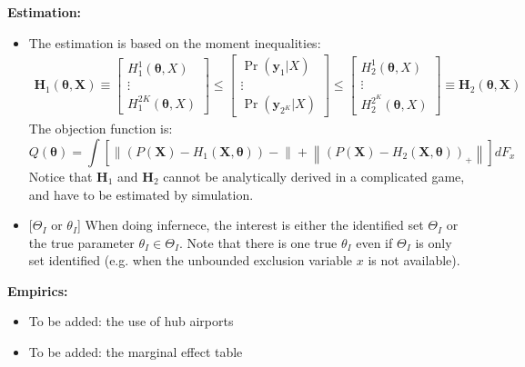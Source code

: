 \documentclass{book}
\theoremstyle{plain}
\theoremstyle{definition}
\newcommand{\red}[1]{{\color{red} #1}}
\newcommand{\mysubtitle}[1]{{\normalsize{\textbf{#1}}}}
\begin{document}
\mysubtitle{Estimation:}
\begin{itemize}
	\item The estimation is based on the moment inequalities:
	\begin{align}
		\mathbf { H } _ { 1 } ( \boldsymbol { \theta } , \mathbf { X } ) \equiv \left[ \begin{array} { c } { H _ { 1 } ^ { 1 } ( \boldsymbol { \theta } , X ) } \\ { \vdots } \\ { H _ { 1 } ^ { 2 K } ( \boldsymbol { \theta } , X ) } \end{array} \right] \leq \left[ \begin{array} { c } { \operatorname { Pr } \left( \mathbf { y } _ { 1 } | X \right) } \\ { \vdots } \\ { \operatorname { Pr } \left( \mathbf { y } _ { 2 ^ { K } } | X \right) } \end{array} \right] \leq \left[ \begin{array} { c } { H _ { 2 } ^ { 1 } ( \boldsymbol { \theta } , X ) } \\ { \vdots } \\ { H _ { 2 } ^ { 2 ^ { K } } ( \boldsymbol { \theta } , X ) } \end{array} \right] \equiv \mathbf { H } _ { 2 } ( \boldsymbol { \theta } , \mathbf { X } )
	\end{align}
	The objection function is:
	\[Q ( \boldsymbol { \theta } ) = \int \left[ \left\| \left( P ( \mathbf { X } ) - H _ { 1 } ( \mathbf { X } , \boldsymbol { \theta } ) \right) - \right\| + \left\| \left( P ( \mathbf { X } ) - H _ { 2 } ( \mathbf { X } , \boldsymbol { \theta } ) \right) _ { + } \right\| \right] d F _ { x }\]
	Notice that $\mathbf H_1$ and $\mathbf H_2$ cannot be analytically derived in a complicated game, and have to be estimated by simulation.

	\item {[$\Theta_I$ or $\theta_I$]} When doing infernece, the interest is either the identified set $\Theta_I$ or the true parameter $\theta_I \in \Theta_I$. Note that there is one true $\theta_I$ even if  $\Theta_I$ is only set identified (e.g. when the unbounded exclusion variable $x$ is not available).
\end{itemize}


\mysubtitle{Empirics:}
\begin{itemize}
	\item \red{To be added: the use of hub airports}
	\item \red{To be added: the marginal effect table}
\end{itemize}
\end{document}
